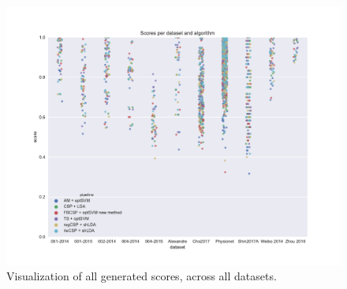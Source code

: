 \begin{figure}
    \centering
    \includegraphics[width=\textwidth]{Figures/full_scores.pdf}
    \caption{Visualization of all generated scores, across all datasets.}
    \label{fig:all}
\end{figure}
